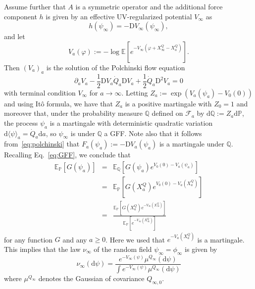\documentclass[reprint,aps]{revtex4-2}
\newcommand{\assign}{:=}
\newcommand{\mathD}{\mathrm{D}}
\newcommand{\mathd}{\mathrm{d}}
\begin{document}
Assume further that $A$ is a symmetric operator and the additional force
component $h$ is given by an effective UV-regularized potential $V_{\infty}$
as
\[ h (\psi_{\infty}) = - \mathD V_{\infty} (\psi_{\infty}), \]
and let
\[ V_a (\varphi) \assign - \log \mathbb{E} [e^{- V_{\infty} (\varphi +
   X_{\infty}^Q - X_a^Q)}] . \]
Then $(V_a)_a$ is the solution of the Polchinski flow
equation~{\cite{polchinskiRenormalizationEffectiveLagrangians1984}}
\begin{equation}
  \partial_a V_a - \frac{1}{2} \mathD V_a \dot{Q}_a \mathD V_a + \frac{1}{2}
  \dot{Q}_a \mathD^2 V_a = 0 \label{eq:polchinski}
\end{equation}
with terminal condition $V_{\infty}$ for $a \rightarrow \infty$. Letting $Z_a
\assign \exp (V_a (\psi_a) - V_0 (0))$ and using It{\^o} formula, we have that
$Z_a$ is a positive martingale with $Z_0 = 1$ and moreover that, under the
probability measure $\mathbb{Q}$ defined on $\mathscr{F} _a$ by $\mathd
\mathbb{Q} \assign Z_a \mathd \mathbb{P}$, the process $\psi_a$ is a
martingale with deterministic quadratic variation $\mathd \langle \psi
\rangle_a = \dot{Q}_a \mathd a$, so $\psi_{\infty}$ is under $\mathbb{Q}$ a
GFF. Note also that it follows from~\eqref{eq:polchinski} that $F_a (\psi_a)
\assign - \mathD V_a (\psi_a)$ is a martingale under $\mathbb{Q}$. Recalling
Eq.~\eqref{eq:GFF}, we conclude that
\begin{equation}
  \begin{array}{lll}
    \mathbb{E}_{\mathbb{P}} [G (\psi_a)] & = & \mathbb{E}_{\mathbb{Q}} [G
    (\psi_a) e^{V_0 (0) - V_a (\psi_a)}]\\
    & = & \mathbb{E}_{\mathbb{P}} [G (X_a^Q) e^{V_0 (0) - V_a (X_a^Q)}]\\
    & = & \frac{\mathbb{E}_{\mathbb{P}} [G (X_a^Q) e^{- V_{\infty}
    (X_{\infty}^Q)}]}{\mathbb{E}_{\mathbb{P}} [e^{- V_{\infty}
    (X_{\infty}^Q)}]}
  \end{array} \label{eq:gibbs}
\end{equation}
for any function $G$ and any $a \geqslant 0$. Here we used that $e^{- V_a
(X^Q_a)}$ is a martingale. This implies that the law $\nu_{\infty}$ of the
random field $\psi_{\infty} = \phi_{\infty}$ is given by
\begin{equation}
  \nu_{\infty} (\mathd \psi) = \frac{e^{- V_{\infty} (\psi)} \mu^{Q_{\infty}}
  (\mathd \psi)}{\int e^{- V_{\infty} (\psi)} \mu^{Q_{\infty}} (\mathd \psi)}
  \label{eq:gibbs-two}
\end{equation}
where $\mu^{Q_{\infty}}$ denotes the Gaussian of covariance $Q_{\infty, 0}$.
\end{document}
